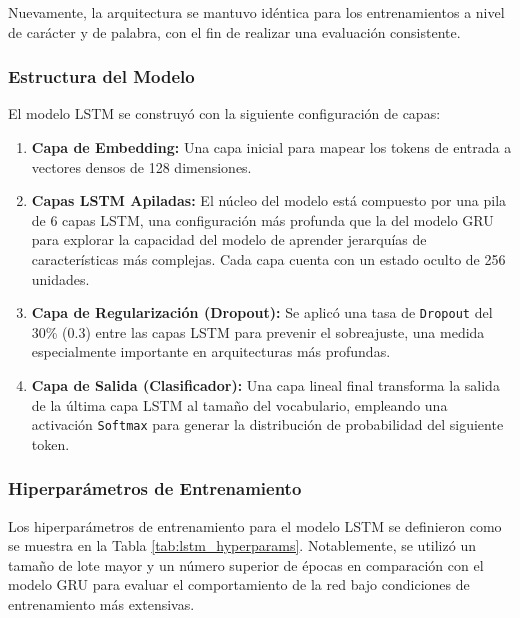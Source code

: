 Nuevamente, la arquitectura se mantuvo idéntica para los entrenamientos a nivel de carácter y de palabra, con el fin de realizar una evaluación consistente.

\subsubsection{Estructura del Modelo}

El modelo LSTM se construyó con la siguiente configuración de capas:

\begin{enumerate}
    \item \textbf{Capa de Embedding:} Una capa inicial para mapear los tokens de entrada a vectores densos de 128 dimensiones.

    \item \textbf{Capas LSTM Apiladas:} El núcleo del modelo está compuesto por una pila de 6 capas LSTM, una configuración más profunda que la del modelo GRU para explorar la capacidad del modelo de aprender jerarquías de características más complejas. Cada capa cuenta con un estado oculto de 256 unidades.

    \item \textbf{Capa de Regularización (Dropout):} Se aplicó una tasa de \texttt{Dropout} del 30\% (0.3) entre las capas LSTM para prevenir el sobreajuste, una medida especialmente importante en arquitecturas más profundas.

    \item \textbf{Capa de Salida (Clasificador):} Una capa lineal final transforma la salida de la última capa LSTM al tamaño del vocabulario, empleando una activación \texttt{Softmax} para generar la distribución de probabilidad del siguiente token.
\end{enumerate}

\subsubsection{Hiperparámetros de Entrenamiento}

Los hiperparámetros de entrenamiento para el modelo LSTM se definieron como se muestra en la Tabla \ref{tab:lstm_hyperparams}. Notablemente, se utilizó un tamaño de lote mayor y un número superior de épocas en comparación con el modelo GRU para evaluar el comportamiento de la red bajo condiciones de entrenamiento más extensivas.

